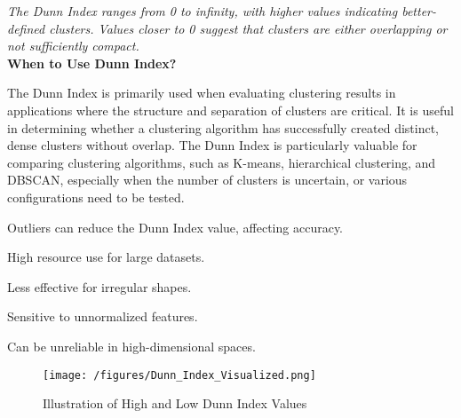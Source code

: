 \textit{The Dunn Index ranges from 0 to infinity, with higher values indicating better-defined clusters. Values closer to 0 suggest that clusters are either overlapping or not sufficiently compact.}\\

\textbf{When to Use Dunn Index?}

The Dunn Index is primarily used when evaluating clustering results in applications where the structure and separation of clusters are critical. It is useful in determining whether a clustering algorithm has successfully created distinct, dense clusters without overlap. The Dunn Index is particularly valuable for comparing clustering algorithms, such as K-means, hierarchical clustering, and DBSCAN, especially when the number of clusters is uncertain, or various configurations need to be tested.

{
	\item Outliers can reduce the Dunn Index value, affecting accuracy.
	\item High resource use for large datasets.
	\item Less effective for irregular shapes.
	\item Sensitive to unnormalized features.
	\item Can be unreliable in high-dimensional spaces.
}

\begin{figure}[h!]
	\centering
	\texttt{[image: /figures/Dunn\_Index\_Visualized.png]} 
	\caption{Illustration of High and Low Dunn Index Values}
\end{figure}

